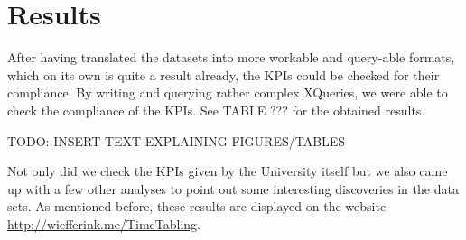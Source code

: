 \section{Results}
After having translated the datasets into more workable and query-able formats, which on its own is quite a result already, the KPIs could be checked for their compliance. By writing and querying rather complex XQueries, we were able to check the compliance of the KPIs. See TABLE ??? for the obtained results.

TODO: INSERT TEXT EXPLAINING FIGURES/TABLES

Not only did we check the KPIs given by the University itself but we also came up with a few other analyses to point out some interesting discoveries in the data sets. As mentioned before, these results are displayed on the website \url{http://wiefferink.me/TimeTabling}.
